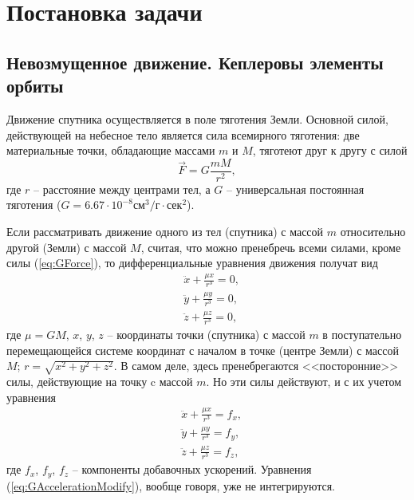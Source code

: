 \section{Постановка задачи}
\subsection{Невозмущенное движение. Кеплеровы элементы орбиты}
\noindent\indent Движение спутника осуществляется в поле тяготения Земли. Основной силой,
действующей на небесное тело является сила всемирного тяготения: две материальные точки,
обладающие массами $m$ и $M$, тяготеют друг к другу с силой
\begin{equation} \label{eq:GForce}
  \vec{F} = G\frac{mM}{r^2},
\end{equation}
где $r$ -- расстояние между центрами тел, а $G$ -- универсальная постоянная тяготения
($G = 6.67\cdot10^{-8}\text{см}^3/г\cdot\text{сек}^2$).\par
Если рассматривать движение одного из тел (спутника) с массой $m$ относительно
другой (Земли) с массой $M$, считая, что можно пренебречь всеми силами, кроме силы
(\ref{eq:GForce}), то дифференциальные уравнения движения получат вид
\begin{equation}
  \begin{aligned}
    &\ddot{x} + \frac{\mu x}{r^3} = 0, \\
    &\ddot{y} + \frac{\mu y}{r^3} = 0, \\
    &\ddot{z} + \frac{\mu z}{r^3} = 0,
  \end{aligned}
\end{equation}
где $\mu = GM$, $x$, $y$, $z$ -- координаты точки (спутника) с массой $m$ в
поступательно перемещающейся системе координат с началом в точке (центре Земли)
с массой $M$; $r = \sqrt{x^2 + y^2 + z^2}$. В самом деле, здесь пренебрегаются
<<посторонние>> силы, действующие на точку c массой $m$. Но эти силы действуют,
и с их учетом уравнения
\begin{equation} \label{eq:GAccelerationModify}
  \begin{aligned}
    &\ddot{x} + \frac{\mu x}{r^3} = f_x, \\
    &\ddot{y} + \frac{\mu y}{r^3} = f_y, \\
    &\ddot{z} + \frac{\mu z}{r^3} = f_z,
  \end{aligned}
\end{equation}
где $f_x$, $f_y$, $f_z$ -- компоненты добавочных ускорений. Уравнения
(\ref{eq:GAccelerationModify}), вообще говоря, уже не интегрируются.\par
